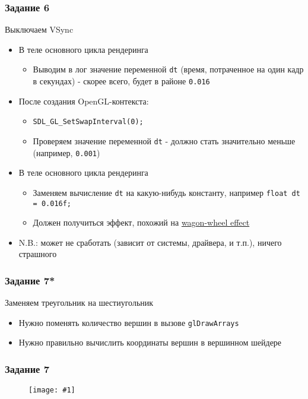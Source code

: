 \documentclass{beamer}
\newcommand{\slideimage}[1]{
  \begin{figure}
    \begin{adjustbox}{width=\textwidth, totalheight=\textheight-2\baselineskip-2\baselineskip,keepaspectratio}
      \texttt{[image: \#1]}
    \end{adjustbox}
  \end{figure}
}
\begin{document}
\begin{frame}[fragile]
\frametitle{Задание 6}
Выключаем VSync
\begin{itemize}
\pause
\item В теле основного цикла рендеринга
\begin{itemize}
\item Выводим в лог значение переменной \verb|dt| (время, потраченное на один кадр в секундах) - скорее всего, будет в районе \verb|0.016|
\end{itemize}
\pause
\item После создания OpenGL-контекста:
\begin{itemize}
\item \verb|SDL_GL_SetSwapInterval(0);|
\pause
\item Проверяем значение переменной \verb|dt| - должно стать значительно меньше (например, \verb|0.001|)
\end{itemize}
\pause
\item В теле основного цикла рендеринга
\begin{itemize}
\item Заменяем вычисление \verb|dt| на какую-нибудь константу, например \verb|float dt = 0.016f;|
\item Должен получиться эффект, похожий на \href{https://en.wikipedia.org/wiki/Wagon-wheel_effect}{wagon-wheel effect}
\end{itemize}
\pause
\item N.B.: может не сработать (зависит от системы, драйвера, и т.п.), ничего страшного
\end{itemize}
\end{frame}

\begin{frame}[fragile]
\frametitle{Задание 7*}
Заменяем треугольник на шестиугольник
\pause
\begin{itemize}
\item Нужно поменять количество вершин в вызове \verb|glDrawArrays|
\pause
\item Нужно правильно вычислить координаты вершин в вершинном шейдере
\end{itemize}
\end{frame}

\begin{frame}
\frametitle{Задание 7}
\slideimage{7.png}
\end{frame}
\end{document}
